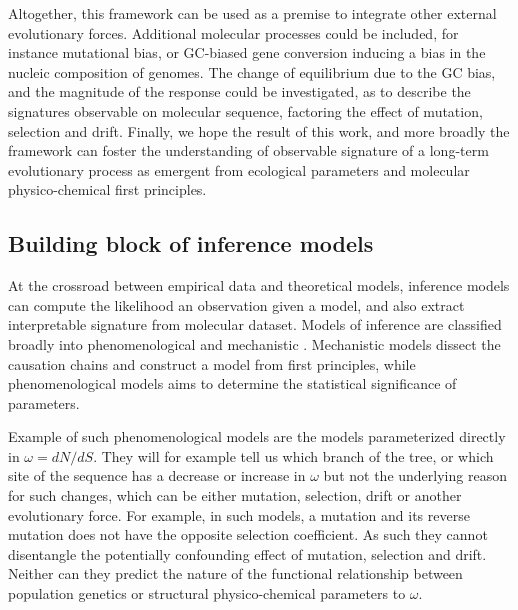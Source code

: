 \documentclass{MBE}%
\begin{document}
Altogether, this framework can be used as a premise %
to integrate other external evolutionary forces.
Additional molecular processes could be included, for instance mutational bias, or GC-biased gene conversion inducing a bias in the nucleic composition of genomes. 
The change of equilibrium due to the GC bias, and the magnitude of the response could be investigated, as to describe the signatures observable on molecular sequence, factoring the effect of mutation, selection and drift.
Finally, we hope the result of this work, and more broadly the framework can foster the understanding of observable signature of a long-term evolutionary process as emergent from ecological parameters and molecular physico-chemical first principles.

\subsection*{Building block of inference models}

At the crossroad between empirical data and theoretical models, inference models can compute the likelihood an observation given a model, and also extract interpretable signature from molecular dataset.
Models of inference are classified broadly into phenomenological and mechanistic \citep{Rodrigue2010a}.
Mechanistic models dissect the causation chains and construct a model from first principles, while phenomenological models aims to determine the statistical significance of parameters.

Example of such phenomenological models are the models parameterized directly in $\omega = dN/dS$.
They will for example tell us which branch of the tree, or which site of the sequence has a decrease or increase in $\omega$ but not the underlying reason for such changes, which can be either mutation, selection, drift or another evolutionary force.
For example, in such models, a mutation and its reverse mutation does not have the opposite selection coefficient.
As such they cannot disentangle the potentially confounding effect of mutation, selection and drift.
Neither can they predict the nature of the functional relationship between population genetics or structural physico-chemical parameters to $\omega$.
\end{document}
